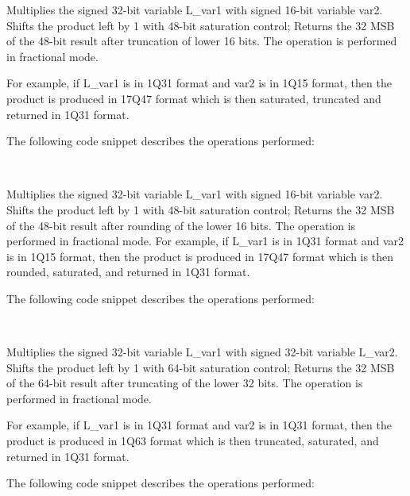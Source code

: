 
Multiplies the signed 32-bit variable L\_var1 with signed 16-bit variable var2.
Shifts the product left by 1 with 48-bit saturation control;
Returns the 32 MSB of the 48-bit result after truncation of lower 16 bits.
The operation is performed in fractional mode.

For example, if L\_var1 is in 1Q31 format and var2 is in 1Q15 format, then the product is produced in 17Q47 format which is then saturated, truncated and returned in 1Q31 format.

The following code snippet describes the operations performed:

\\



Multiplies the signed 32-bit variable L\_var1 with signed 16-bit variable var2. Shifts the product left by 1 with 48-bit saturation control; Returns the 32 MSB of the 48-bit result after rounding of the lower 16 bits.
The operation is performed in fractional mode.
For example, if L\_var1 is in 1Q31 format and var2 is in 1Q15 format, then the product is produced in 17Q47 format which is then rounded, saturated, and returned in 1Q31 format.

The following code snippet describes the operations performed:

\\


Multiplies the signed 32-bit variable L\_var1 with signed 32-bit variable L\_var2.
Shifts the product left by 1 with 64-bit saturation control;
Returns the 32 MSB of the 64-bit result after truncating of the lower 32 bits.
The operation is performed in fractional mode.

For example, if L\_var1 is in 1Q31 format and var2 is in 1Q31 format, then the product is produced in 1Q63 format which is then truncated, saturated, and returned in 1Q31 format.

The following code snippet describes the operations performed:

